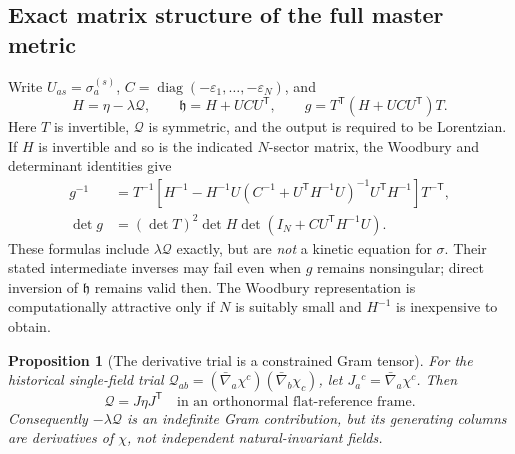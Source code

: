 \documentclass[11pt,a4paper]{article}
\newtheorem{proposition}[theorem]{Proposition}
\begin{document}
\subsection{Exact matrix structure of the full master metric}\label{sec:full-matrix}
Write \(U_{as}=\sigma_a^{(s)}\), \(C=\operatorname{diag}(-\varepsilon_1,\ldots,-\varepsilon_N)\), and
\begin{equation}\label{eq:full-matrix-block}
 H=\eta-\lambda\mathcal Q,\qquad
 \mathfrak h=H+UCU^{\mathsf T},\qquad
 \boxed{g=T^{\mathsf T}(H+UCU^{\mathsf T})T.}
\end{equation}
Here \(T\) is invertible, \(\mathcal Q\) is symmetric, and the output is required to be Lorentzian. If \(H\) is invertible and so is the indicated \(N\)-sector matrix, the Woodbury and determinant identities give
\begin{align}\label{eq:full-woodbury}
 g^{-1}&=T^{-1}\!\left[H^{-1}-H^{-1}U(C^{-1}+U^{\mathsf T}H^{-1}U)^{-1}U^{\mathsf T}H^{-1}\right]\!T^{-\mathsf T},\\
 \det g&=(\det T)^2\det H\det(I_N+CU^{\mathsf T}H^{-1}U).
\end{align}
These formulas include \(\lambda\mathcal Q\) exactly, but are \emph{not} a kinetic equation for \(\sigma\). Their stated intermediate inverses may fail even when \(g\) remains nonsingular; direct inversion of \(\mathfrak h\) remains valid then. The Woodbury representation is computationally attractive only if \(N\) is suitably small and \(H^{-1}\) is inexpensive to obtain.

\begin{proposition}[The derivative trial is a constrained Gram tensor]\label{prop:Q-Gram}
For the historical single-field trial \(\mathcal Q_{ab}=(\bar\nabla_a\chi^c)(\bar\nabla_b\chi_c)\), let \(J_a{}^c=\bar\nabla_a\chi^c\). Then
\begin{equation}\label{eq:Q-gram}
 \mathcal Q=J\eta J^{\mathsf T}\quad\text{in an orthonormal flat-reference frame}.
\end{equation}
Consequently \(-\lambda\mathcal Q\) is an indefinite Gram contribution, but its generating columns are derivatives of \(\chi\), \emph{not independent natural-invariant fields}.
\end{proposition}
\end{document}
